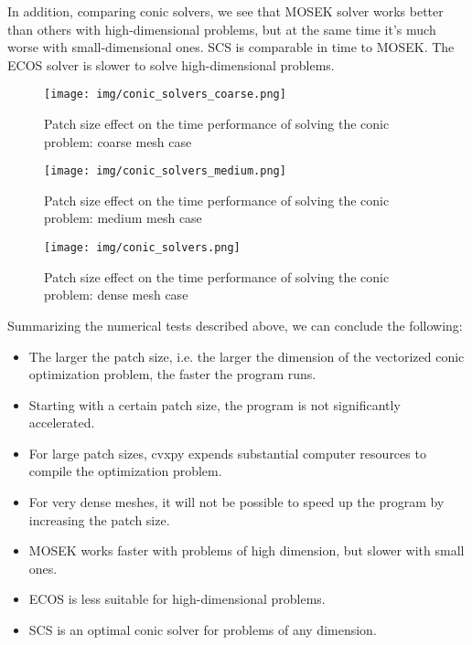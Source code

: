 \documentclass[12pt]{article}
\begin{document}
In addition, comparing conic solvers, we see that MOSEK solver works better than others with high-dimensional problems, but at the same time it's much worse with small-dimensional ones. SCS is comparable in time to MOSEK. The ECOS solver is slower to solve high-dimensional problems.

\begin{figure}[H]
    \center
    \texttt{[image: img/conic\_solvers\_coarse.png]}
    \caption{Patch size effect on the time performance of solving the conic problem: coarse mesh case}
    \label{fig:conic_solvers_coarse}
\end{figure}

\begin{figure}[H]
    \center
    \texttt{[image: img/conic\_solvers\_medium.png]}
    \caption{Patch size effect on the time performance of solving the conic problem: medium mesh case}
    \label{fig:conic_solvers_medium}
\end{figure}

\begin{figure}[H]
    \center
    \texttt{[image: img/conic\_solvers.png]}
    \caption{Patch size effect on the time performance of solving the conic problem: dense mesh case}
    \label{fig:conic_solvers_dense}
\end{figure}

Summarizing the numerical tests described above, we can conclude the following:
\begin{itemize}
    \item The larger the patch size, i.e. the larger the dimension of the vectorized conic optimization problem, the faster the program runs.
    \item Starting with a certain patch size, the program is not significantly accelerated.
    \item For large patch sizes, cvxpy expends substantial computer resources to compile the optimization problem.
    \item For very dense meshes, it will not be possible to speed up the program by increasing the patch size.
    \item MOSEK works faster with problems of high dimension, but slower with small ones.
    \item ECOS is less suitable for high-dimensional problems.
    \item SCS is an optimal conic solver for problems of any dimension.
\end{itemize}
\end{document}
